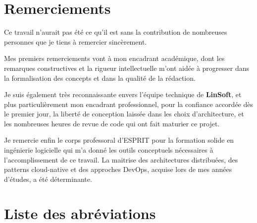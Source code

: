 \documentclass[12pt,a4paper]{report}
\begin{document}
\chapter*{Remerciements}

Ce travail n'aurait pas \'et\'e ce qu'il est sans la contribution de nombreuses personnes que
je tiens \`a remercier sinc\`erement.

Mes premiers remerciements vont \`a mon encadrant acad\'emique, dont les remarques
constructives et la rigueur intellectuelle m'ont aid\'ee \`a progresser dans la formalisation
des concepts et dans la qualit\'e de la r\'edaction.

Je suis \'egalement tr\`es reconnaissante envers l'\'equipe technique de \textbf{LinSoft}, et plus
particuli\`erement mon encadrant professionnel, pour la confiance accord\'ee d\`es le premier
jour, la libert\'e de conception laiss\'ee dans les choix d'architecture, et les nombreuses
heures de revue de code qui ont fait maturier ce projet.

Je remercie enfin le corps professoral d'ESPRIT pour la formation solide en ing\'enierie
logicielle qui m'a donn\'e les outils conceptuels n\'ecessaires \`a l'accomplissement de ce
travail. La maitrise des architectures distribu\'ees, des patterns cloud-native et des
approches DevOps, acquise lors de mes ann\'ees d'\'etudes, a \'et\'e d\'eterminante.

\chapter*{Liste des abr\'eviations}
\end{document}
